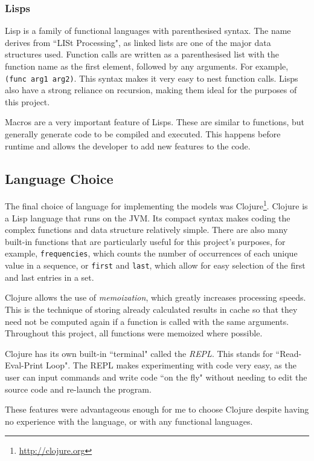 \subsubsection{Lisps}

Lisp is a family of functional languages with parenthesised syntax. The name derives from ``LISt Processing", as linked lists are one of the major data structures used. Function calls are written as a parenthesised list with the function name as the first element, followed by any arguments. For example, \lstinline!(func arg1 arg2)!. This syntax makes it very easy to nest function calls. Lisps also have a strong reliance on recursion, making them ideal for the purposes of this project. 

Macros are a very important feature of Lisps. These are similar to functions, but generally generate code to be compiled and executed. This happens before runtime and allows the developer to add new features to the code.



\subsection{Language Choice}

The final choice of language for implementing the models was Clojure\footnote{\url{http://clojure.org}}. Clojure is a Lisp language that runs on the JVM. Its compact syntax makes coding the complex functions and data structure relatively simple. There are also many  built-in functions that are particularly useful for this project's purposes, for example, \lstinline!frequencies!, which counts the number of occurrences of each unique value in a sequence, or \lstinline!first! and \lstinline!last!, which allow for easy selection of the first and last entries in a set.

Clojure allows the use of \textit{memoization}, which greatly increases processing speeds. This is the technique of storing already calculated results in cache so that they need not be computed again if a function is called with the same arguments. Throughout this project, all functions were memoized where possible.

Clojure has its own built-in ``terminal" called the \textit{REPL}. This stands for ``Read-Eval-Print Loop". The REPL makes experimenting with code very easy, as the user can input commands and write code ``on the fly" without needing to edit the source code and re-launch the program.

These features were advantageous enough for me to choose Clojure despite having no experience with the language, or with any functional languages.


